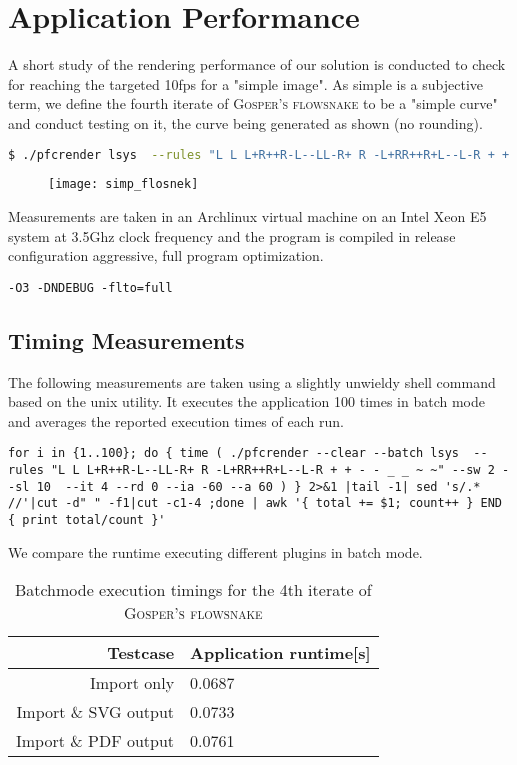 \chapter{Application Performance}
A short study of the rendering performance of our solution is conducted to check for reaching the targeted 10fps for a "simple image". As simple is a subjective term, we define the fourth iterate of \textsc{Gosper's flowsnake} to be a "simple curve" and conduct testing on it, the curve being generated as shown (no rounding).

\begin{lstlisting}[language=bash]
$ ./pfcrender lsys  --rules "L L L+R++R-L--LL-R+ R -L+RR++R+L--L-R + + - - _ _ ~ ~" --sw 2 --sl 10  --it 4 --rd 0 --ia -60 --a 60
\end{lstlisting}
\begin{figure}[ht]
	\centering
	\texttt{[image: simp\_flosnek]}
\end{figure}

Measurements are taken in an Archlinux virtual machine on an Intel Xeon E5 system at 3.5Ghz clock frequency and the program is compiled in release configuration aggressive, full program optimization.
\begin{lstlisting}
-O3 -DNDEBUG -flto=full 
\end{lstlisting}

\section{Timing Measurements}
The following measurements are taken using a slightly unwieldy shell command based on the unix  utility. It executes the application 100 times in batch mode and averages the reported execution times of each run.
\begin{lstlisting}
for i in {1..100}; do { time ( ./pfcrender --clear --batch lsys  --rules "L L L+R++R-L--LL-R+ R -L+RR++R+L--L-R + + - - _ _ ~ ~" --sw 2 --sl 10  --it 4 --rd 0 --ia -60 --a 60 ) } 2>&1 |tail -1| sed 's/.*  //'|cut -d" " -f1|cut -c1-4 ;done | awk '{ total += $1; count++ } END { print total/count }'
\end{lstlisting}

We compare the runtime executing different plugins in batch mode.
\begin{table}[h]
	\centering
	\begin{tabular}{r|l}
		Testcase & Application runtime[s]\\\hline
		Import only & 0.0687\\\hline
		Import \& SVG output & 0.0733\\\hline
		Import \& PDF output & 0.0761
	\end{tabular}
	\caption{Batchmode execution timings for the 4th iterate of \textsc{Gosper's flowsnake}}
\end{table}


